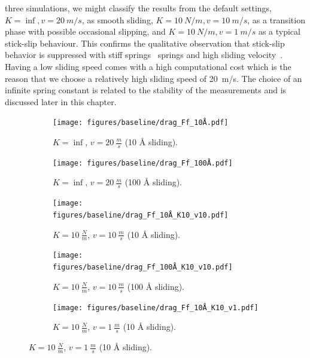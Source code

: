 three simulations, we might classify the results from the default settings, $K =
\inf, v = \SI{20}{m/s}$, as smooth sliding, $K = \SI{10}{N/m}, v =
\SI{10}{m/s}$, as a transition phase with possible occasional slipping, and $K =
\SI{10}{N/m}, v = \SI{1}{m/s}$ as a typical stick-slip behaviour. This confirms
the qualitative observation that stick-slip behavior is suppressed with stiff
springs~\cite{bonelli_atomistic_2009} springs and high sliding
velocity~\cite{liu_high-speed_2014}. Having a low sliding speed comes with a
high computational cost which is the reason that we choose a relatively high
sliding speed of \SI{20}{m/s}. The choice of an infinite spring constant is
related to the stability of the measurements and is discussed later in this
chapter.


\begin{figure}[H]
  \centering
  \begin{subfigure}[t]{0.49\textwidth}
      \centering
      \texttt{[image: figures/baseline/drag\_Ff\_10Å.pdf]}
      \caption{$K = \inf$, $v = \SI{20}{\frac{m}{s}}$ (10 Å sliding).}
      \label{fig:drag_Ff_10}
  \end{subfigure}
  \hfill
  \begin{subfigure}[t]{0.49\textwidth}
      \centering
      \texttt{[image: figures/baseline/drag\_Ff\_100Å.pdf]}
      \caption{$K = \inf$, $v = \SI{20}{\frac{m}{s}}$ (100 Å sliding).}
      \label{fig:drag_Ff_100}
    \end{subfigure}
    \hfill
    \begin{subfigure}[t]{0.49\textwidth}
      \centering
      \texttt{[image: figures/baseline/drag\_Ff\_10Å\_K10\_v10.pdf]}
      \caption{$K = \SI{10}{\frac{N}{m}}$, $v = \SI{10}{\frac{m}{s}}$ (10 Å sliding).}
      \label{fig:drag_Ff_10_K10_v10}
    \end{subfigure}
    \hfill
    \begin{subfigure}[t]{0.49\textwidth}
      \centering
      \texttt{[image: figures/baseline/drag\_Ff\_100Å\_K10\_v10.pdf]}
      \caption{$K = \SI{10}{\frac{N}{m}}$, $v = \SI{10}{\frac{m}{s}}$ (100 Å sliding).}
      \label{fig:drag_Ff_100_K10_v10}
  \end{subfigure}
  \hfill
    \begin{subfigure}[t]{0.49\textwidth}
      \centering
      \texttt{[image: figures/baseline/drag\_Ff\_10Å\_K10\_v1.pdf]}
      \caption{$K = \SI{10}{\frac{N}{m}}$, $v = \SI{1}{\frac{m}{s}}$ (10 Å sliding).}
      \label{fig:drag_Ff_10_K10_v1}
    \end{subfigure}

\end{figure}
